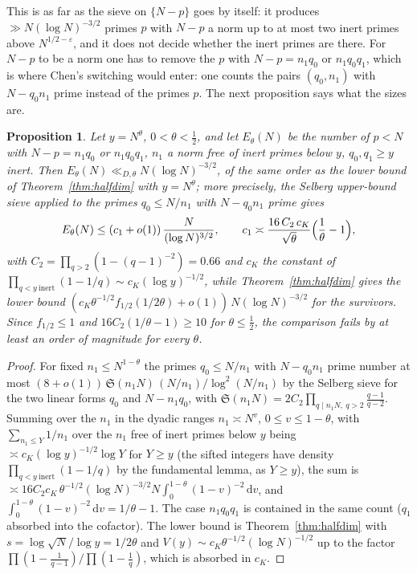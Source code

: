 \documentclass[11pt]{amsart}
\newtheorem{proposition}[theorem]{Proposition}
\theoremstyle{definition}
\theoremstyle{remark}
\newcommand{\e}{\varepsilon}
\newcommand{\dd}{\,\mathrm d}
\begin{document}
This is as far as the sieve on $\{N-p\}$ goes by itself: it produces $\gg N(\log N)^{-3/2}$ primes $p$ with $N-p$ a norm up to at most two inert primes above $N^{1/2-\e}$, and it does not decide whether the inert primes are there. For $N-p$ to be a norm one has to remove the $p$ with $N-p=n_1q_0$ or $n_1q_0q_1$, which is where Chen's switching would enter: one counts the pairs $(q_0,n_1)$ with $N-q_0n_1$ prime instead of the primes $p$. The next proposition says what the sizes are.

\begin{proposition}\label{prop:switch}
Let $y=N^\theta$, $0<\theta<\frac12$, and let $E_\theta(N)$ be the number of $p<N$ with $N-p=n_1q_0$ or $n_1q_0q_1$, $n_1$ a norm free of inert primes below $y$, $q_0,q_1\ge y$ inert. Then $E_\theta(N)\ll_{D,\theta}N(\log N)^{-3/2}$, of the same order as the lower bound of Theorem~\ref{thm:halfdim} with $y=N^\theta$; more precisely, the Selberg upper-bound sieve applied to the primes $q_0\le N/n_1$ with $N-q_0n_1$ prime gives
\[
E_\theta(N)\le(c_1+o(1))\,\frac N{(\log N)^{3/2}},\qquad c_1\asymp\frac{16\,C_2\,c_K}{\sqrt\theta}\Bigl(\frac1\theta-1\Bigr),
\]
with $C_2=\prod_{q>2}(1-(q-1)^{-2})=0.66$ and $c_K$ the constant of $\prod_{q<y\ \mathrm{inert}}(1-1/q)\sim c_K(\log y)^{-1/2}$, while Theorem~\ref{thm:halfdim} gives the lower bound $(c_K\theta^{-1/2}f_{1/2}(1/2\theta)+o(1))\,N(\log N)^{-3/2}$ for the survivors. Since $f_{1/2}\le1$ and $16C_2(1/\theta-1)\ge10$ for $\theta\le\frac12$, the comparison fails by at least an order of magnitude for every $\theta$.
\end{proposition}
\begin{proof}
For fixed $n_1\le N^{1-\theta}$ the primes $q_0\le N/n_1$ with $N-q_0n_1$ prime number at most $(8+o(1))\,\mathfrak S(n_1N)\,(N/n_1)/\log^2(N/n_1)$ by the Selberg sieve for the two linear forms $q_0$ and $N-n_1q_0$, with $\mathfrak S(n_1N)=2C_2\prod_{q\mid n_1N,\ q>2}\frac{q-1}{q-2}$. Summing over the $n_1$ in the dyadic ranges $n_1\asymp N^v$, $0\le v\le1-\theta$, with $\sum_{n_1\le Y}1/n_1$ over the $n_1$ free of inert primes below $y$ being $\asymp c_K(\log y)^{-1/2}\log Y$ for $Y\ge y$ (the sifted integers have density $\prod_{q<y\ \mathrm{inert}}(1-1/q)$ by the fundamental lemma, as $Y\ge y$), the sum is $\asymp16C_2c_K\,\theta^{-1/2}(\log N)^{-3/2}N\int_0^{1-\theta}(1-v)^{-2}\dd v$, and $\int_0^{1-\theta}(1-v)^{-2}\dd v=1/\theta-1$. The case $n_1q_0q_1$ is contained in the same count ($q_1$ absorbed into the cofactor). The lower bound is Theorem~\ref{thm:halfdim} with $s=\log\sqrt N/\log y=1/2\theta$ and $V(y)\sim c_K\theta^{-1/2}(\log N)^{-1/2}$ up to the factor $\prod(1-\frac1{q-1})/\prod(1-\frac1q)$, which is absorbed in $c_K$.
\end{proof}
\end{document}
